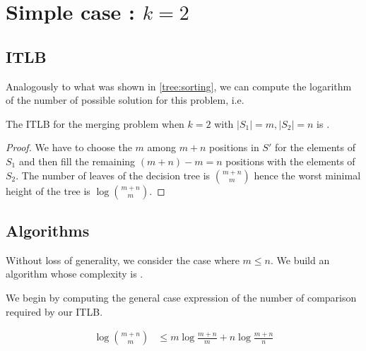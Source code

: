 \section{Simple case : $k=2$}
\label{tree:merging:k=2}

\subsection{ITLB}
\label{tree:merging:k=2:ITLB}

Analogously to what was shown in \ref{tree:sorting}, we can compute the logarithm of the number of possible solution for this problem, i.e.

\begin{theorem}
The ITLB for the merging problem when $k = 2$ with $|S_1| = m, |S_2| = n$ is .
\end{theorem}

\begin{proof}
We have to choose the $m$ among $m+n$ positions in $S'$ for the elements of $S_1$ and then fill the remaining $(m+n) - m = n$ positions with the elements of $S_2$. The number of leaves of the decision tree is $\binom{m+n}{m}$ hence the worst minimal height of the tree is $\log \binom{m+n}{m}$.
\end{proof}



\subsection{Algorithms}
\label{tree:merging:k=2:alg}

Without loss of generality, we consider the case where $m \leq n$. We build an algorithm whose complexity is .


We begin by computing the general case expression of the number of comparison required by our ITLB.


\begin{lemma}
\begin{align*}
\log\binom{m+n}{m} &\leq m \log\frac{m+n}{m} + n \log\frac{m+n}{n}\\
\end{align*}
\end{lemma}

